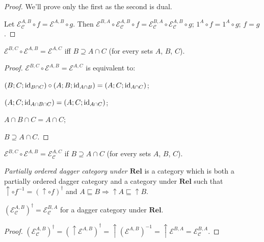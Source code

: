 \begin{proof}
  We'll prove only the first as the second is dual.
  
  Let $\mathcal{E}_{\mathcal{C}}^{A,B} \circ f = \mathcal{E}^{A,B} \circ g$. Then
  $\mathcal{E}^{B,A} \circ \mathcal{E}_{\mathcal{C}}^{A,B}
  \circ f = \mathcal{E}_{\mathcal{C}}^{B,A} \circ \mathcal{E}_{\mathcal{C}}^{A,B} \circ g$;
  $1^A \circ f = 1^A \circ g$; $f = g$.
\end{proof}

\begin{prop}
  $\mathcal{E}^{B,C} \circ \mathcal{E}^{A,B} = \mathcal{E}^{A,C}$
  iff $B \supseteq A \cap C$ (for every sets $A$, $B$, $C$).
\end{prop}

\begin{proof}
  $\mathcal{E}^{B,C} \circ \mathcal{E}^{A,B} = \mathcal{E}^{A,C}$
  is equivalent to:
  
  $(B ; C ; \operatorname{id}_{B \cap C}) \circ (A ; B ; \operatorname{id}_{A \cap B}) = (A ;
  C ; \operatorname{id}_{A \cap C})$;
  
  $(A ; C ; \operatorname{id}_{A \cap B \cap C}) = (A ; C ; \operatorname{id}_{A \cap C})$;
  
  $A \cap B \cap C = A \cap C$;
  
  $B \supseteq A \cap C$.
\end{proof}

\begin{cor}
  $\mathcal{E}^{B,C} \circ \mathcal{E}^{A,B} = \mathcal{E}_{\mathcal{C}}^{A,C}$ if
  $B \supseteq A \cap C$ (for every sets $A$, $B$, $C$).
\end{cor}

\begin{defn}
  \emph{Partially ordered dagger category under $\mathbf{Rel}$} is
  a category which is both a partially ordered dagger category and a category
  under $\mathbf{Rel}$ such that $\uparrow \circ f^{- 1} = (\uparrow
  \circ f)^{\dagger}$ and $A \sqsubseteq B \Rightarrow \uparrow A \sqsubseteq
  \uparrow B$.
\end{defn}

\begin{prop}
  $(\mathcal{E}_{\mathcal{C}}^{A,B})^{\dagger} = \mathcal{E}_{\mathcal{C}}^{B,A}$ for a dagger category under
  $\mathbf{Rel}$.
\end{prop}

\begin{proof}
  $(\mathcal{E}_{\mathcal{C}}^{A,B})^{\dagger} = (\uparrow \mathcal{E}^{A,B})^{\dagger} = \uparrow (\mathcal{E}^{A,B})^{- 1} =
  \uparrow \mathcal{E}^{B,A} = \mathcal{E}_{\mathcal{C}}^{B,A}$.
\end{proof}

